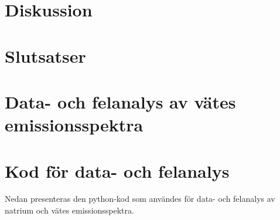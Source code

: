 \documentclass[12pt, a4paper]{article}
\begin{document}
\section{Diskussion}

\section{Slutsatser}
\newpage

\printbibliography

\appendix
\section{Data- och felanalys av vätes emissionsspektra}
\label{app:felanalys}
\section{Kod för data- och felanalys}
\label{app:python-kod}
Nedan presenteras den python-kod som användes för data- och felanalys av natrium och vätes emissionsspektra.
\end{document}
